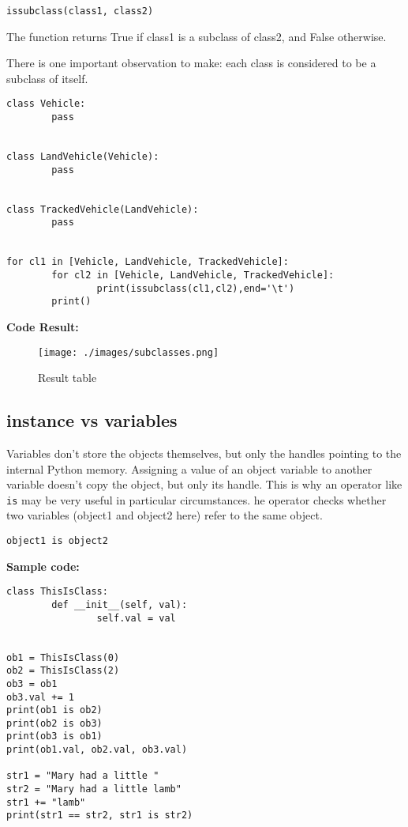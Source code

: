 \documentclass[11pt]{article}
\begin{document}
\texttt{issubclass(class1, class2)}

The function returns True if class1 is a subclass of class2, and False
otherwise.

There is one important observation to make: each class is considered
to be a subclass of itself.

\begin{verbatim}
class Vehicle:
        pass


class LandVehicle(Vehicle):
        pass


class TrackedVehicle(LandVehicle):
        pass


for cl1 in [Vehicle, LandVehicle, TrackedVehicle]:
        for cl2 in [Vehicle, LandVehicle, TrackedVehicle]:
                print(issubclass(cl1,cl2),end='\t')
        print()

\end{verbatim}

\textbf{Code Result:}

\begin{figure}[htbp]
\centering
\texttt{[image: ./images/subclasses.png]}
\caption{Result table}
\end{figure}
\subsection{instance vs variables}
\label{sec:orgbc66067}
Variables don’t store the objects themselves, but only the handles
pointing to the internal Python memory. Assigning a value of an object
variable to another variable doesn’t copy the object, but only its
handle. This is why an operator like \texttt{is} may be very useful in
particular circumstances. he operator checks whether two variables
(object1 and object2 here) refer to the same object.

\texttt{object1 is object2}
\vspace{10 mm}

\textbf{Sample code:}

\begin{verbatim}
class ThisIsClass:
        def __init__(self, val):
                self.val = val


ob1 = ThisIsClass(0)
ob2 = ThisIsClass(2)
ob3 = ob1
ob3.val += 1
print(ob1 is ob2)
print(ob2 is ob3)
print(ob3 is ob1)
print(ob1.val, ob2.val, ob3.val)

str1 = "Mary had a little "
str2 = "Mary had a little lamb"
str1 += "lamb"
print(str1 == str2, str1 is str2)

\end{verbatim}
\end{document}
